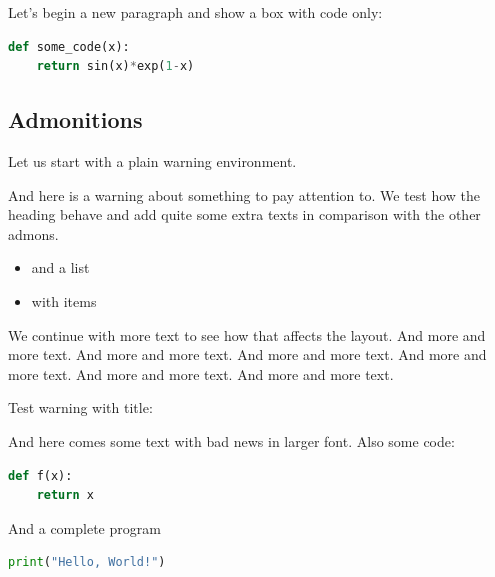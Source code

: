 \documentclass[%
oneside,                 %
final,                   %
10pt]{article}
\newenvironment{warningshaded}
{\def\FrameCommand{\fboxsep=3mm\colorbox{colors1_warning_background}}
 \MakeFramed {\advance\hsize-\width \FrameRestore}}{\endMakeFramed}
\newenvironment{warning_colors1admon}[1][Warning]{
\begin{warningshaded}
\noindent
\texttt{[image: latex\_figs/warning]}\ \ \   \textbf{#1}\\ \par
\vspace{-3mm}\nobreak\noindent\ignorespaces
}
{
\end{warningshaded}
}
\begin{document}
Let's begin a new paragraph and show a box with code only:

\begin{center}
\begin{Sbox}
\begin{minipage}{0.85\linewidth}
\begin{lstlisting}[language=Python,style=simple,xleftmargin=2mm]
def some_code(x):
    return sin(x)*exp(1-x)

\end{lstlisting}
\end{minipage}
\end{Sbox}
\fbox{\TheSbox}
\end{center}
\subsection{Admonitions}
Let us start with a plain warning environment.

\begin{warning_colors1admon}[Warning]
And here is a warning about something to pay attention to. We
test how the heading behave and add quite some extra texts
in comparison with the other admons.
\begin{itemize}
  \item and a list
  \item with items
\end{itemize}
\noindent
We continue with more text to see how that affects the layout.
And more and more text.
And more and more text.
And more and more text.
And more and more text.
And more and more text.
And more and more text.
\end{warning_colors1admon} %


Test warning with title:

\begin{warning_colors1admon}
{\large And here comes some text with bad news in larger font.
Also some code:
\begin{lstlisting}[language=Python,style=simple,xleftmargin=2mm]
def f(x):
    return x

\end{lstlisting}

And a complete program
\begin{lstlisting}[language=Python,style=simple,xleftmargin=2mm]
print("Hello, World!")

\end{lstlisting}
\par}
\end{warning_colors1admon} %
\end{document}
